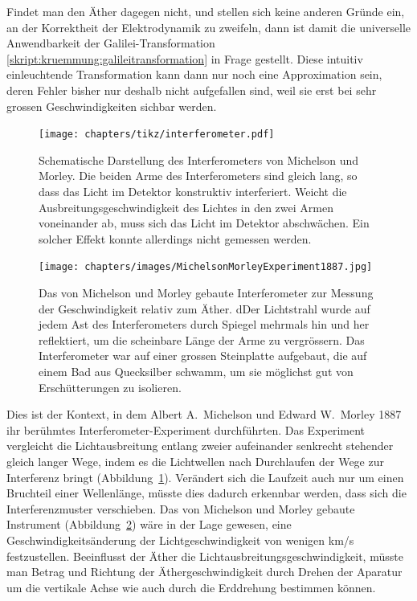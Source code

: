 Findet man den Äther dagegen nicht, und stellen sich keine anderen Gründe
ein, an der Korrektheit der Elektrodynamik zu zweifeln, dann ist damit
die universelle Anwendbarkeit der Galilei-Transformation 
\eqref{skript:kruemmung:galileitransformation} in Frage gestellt.
Diese intuitiv einleuchtende Transformation kann dann nur noch eine
Approximation sein, deren Fehler bisher nur deshalb nicht aufgefallen
sind, weil sie erst bei sehr grossen Geschwindigkeiten sichbar werden.

\begin{figure}
\centering
\texttt{[image: chapters/tikz/interferometer.pdf]}
\caption{Schematische Darstellung des Interferometers von Michelson und Morley.
Die beiden Arme des Interferometers sind gleich lang, so dass das Licht
im Detektor konstruktiv interferiert.
Weicht die Ausbreitungsgeschwindigkeit des Lichtes in den zwei Armen
voneinander ab, muss sich das Licht im Detektor abschwächen.
Ein solcher Effekt konnte allerdings nicht gemessen werden.
\label{skript:speziell:interferometerprinzip}}
\end{figure}

\begin{figure}
\centering
\texttt{[image: chapters/images/MichelsonMorleyExperiment1887.jpg]}
\caption{Das von Michelson und Morley gebaute Interferometer zur Messung
der Geschwindigkeit relativ zum Äther.
dDer Lichtstrahl wurde auf jedem Ast des Interferometers durch Spiegel
mehrmals hin und her reflektiert, um die scheinbare Länge der Arme
zu vergrössern.
Das Interferometer war auf einer grossen Steinplatte aufgebaut, die auf einem
Bad aus Quecksilber schwamm, um sie möglichst gut von Erschütterungen zu
isolieren.
\label{MMinterferometer}}
\end{figure}
Dies ist der Kontext, in dem Albert A.~Michelson und Edward W.~Morley
1887
%
%
%
%
ihr berühmtes Interfero\-meter-Experiment durchführten.
Das Experiment vergleicht die Lichtausbreitung entlang zweier aufeinander
senkrecht stehender gleich langer Wege, indem es die Lichtwellen nach 
Durchlaufen der Wege zur Interferenz bringt
(Abbildung~\ref{skript:speziell:interferometerprinzip}).
Verändert sich die Laufzeit auch nur um einen Bruchteil einer Wellenlänge,
müsste dies dadurch erkennbar werden, dass sich die Interferenzmuster
verschieben.
Das von Michelson und Morley gebaute Instrument
(Abbildung~\ref{MMinterferometer}) wäre in der Lage
gewesen, eine Geschwindigkeitsänderung der Lichtgeschwindigkeit von
wenigen km/s festzustellen.
Beeinflusst der Äther die Lichtausbreitungsgeschwindigkeit, müsste 
man Betrag und Richtung der Äthergeschwindigkeit durch Drehen der
Aparatur um die vertikale Achse wie auch durch die Erddrehung
bestimmen können.

